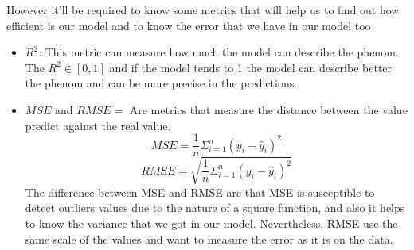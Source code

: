 \documentclass{article}
\begin{document}
However it'll be required to know some metrics that will help us to find out how efficient is our model and to know the error that we have in our model too\citep{bruce2020practical}
\begin{itemize}
  \item $R^2$: This metric can measure how much the model can describe the phenom. The $R^2 \in [0,1]$ and if the model tends to 1 the model can describe better the phenom and can be more precise in the predictions.
  \item $MSE$ and $RMSE = $ Are metrics that measure the distance between the value predict against the real value.
  $$MSE=\frac{1}{n}\Sigma^{n}_{i=1}(y_i-\hat{y}_i)^2 $$
    $$RMSE=\sqrt{\frac{1}{n}\Sigma^{n}_{i=1}(y_i-\hat{y}_i)^2} $$
    The difference between MSE and RMSE are that MSE is susceptible to detect outliers values due to the nature of a square function, and also it helps to know the variance that we got in our model. Nevertheless, RMSE use the same scale of the values and want to measure the error as it is on the data.

\end{itemize}
\end{document}
